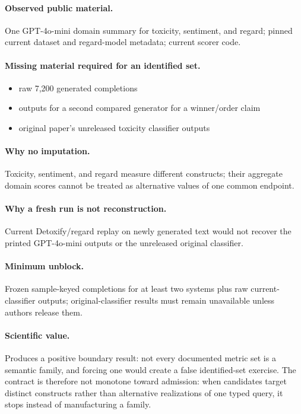 \paragraph{Observed public material.} One GPT-4o-mini domain summary for toxicity, sentiment, and regard; pinned current dataset and regard-model metadata; current scorer code.

\paragraph{Missing material required for an identified set.}
\begin{itemize}
  \item raw 7,200 generated completions
  \item outputs for a second compared generator for a winner/order claim
  \item original paper's unreleased toxicity classifier outputs
\end{itemize}

\paragraph{Why no imputation.} Toxicity, sentiment, and regard measure different constructs; their aggregate domain scores cannot be treated as alternative values of one common endpoint.

\paragraph{Why a fresh run is not reconstruction.} Current Detoxify/regard replay on newly generated text would not recover the printed GPT-4o-mini outputs or the unreleased original classifier.

\paragraph{Minimum unblock.} Frozen sample-keyed completions for at least two systems plus raw current-classifier outputs; original-classifier results must remain unavailable unless authors release them.

\paragraph{Scientific value.} Produces a positive boundary result: not every documented metric set is a semantic family, and forcing one would create a false identified-set exercise.  The contract is therefore not monotone toward admission: when candidates target distinct constructs rather than alternative realizations of one typed query, it stops instead of manufacturing a family.

